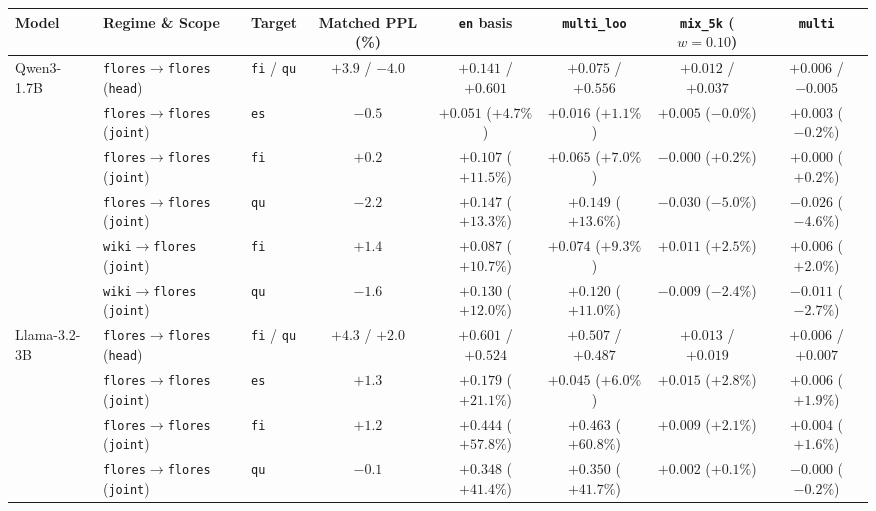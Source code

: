 \documentclass[11pt,a4paper,twocolumn]{article}
\begin{document}
\begin{table}[t]
\centering
\small
\setlength{\tabcolsep}{4.5pt}
\begin{tabular}{lllccccc}
\toprule
Model & Regime \& Scope & Target & Matched PPL (\%) & \texttt{en} basis & \texttt{multi\_loo} & \textbf{\texttt{mix\_5k}} ($w=0.10$) & \texttt{multi} \\
\midrule
\multirow{6}{*}{Qwen3-1.7B}
  & \texttt{flores$\rightarrow$flores} (\texttt{head}) & \texttt{fi} / \texttt{qu} & $+3.9$ / $-4.0$ & $+0.141$ / $\mathbf{+0.601}$ & $+0.075$ / $\mathbf{+0.556}$ & $+0.012$ / $+0.037$ & $+0.006$ / $-0.005$ \\
  & \texttt{flores$\rightarrow$flores} (\texttt{joint}) & \texttt{es} & $-0.5$ & $+0.051$ ($+4.7\%$) & $+0.016$ ($+1.1\%$) & $\mathbf{+0.005}$ ($-0.0\%$) & $+0.003$ ($-0.2\%$) \\
  & \texttt{flores$\rightarrow$flores} (\texttt{joint}) & \texttt{fi} & $+0.2$ & $+0.107$ ($+11.5\%$) & $+0.065$ ($+7.0\%$) & $\mathbf{-0.000}$ ($+0.2\%$) & $+0.000$ ($+0.2\%$) \\
  & \texttt{flores$\rightarrow$flores} (\texttt{joint}) & \texttt{qu} & $-2.2$ & $\mathbf{+0.147}$ ($+13.3\%$) & $\mathbf{+0.149}$ ($+13.6\%$) & $\mathbf{-0.030}$ ($-5.0\%$) & $-0.026$ ($-4.6\%$) \\
  & \texttt{wiki$\rightarrow$flores} (\texttt{joint}) & \texttt{fi} & $+1.4$ & $+0.087$ ($+10.7\%$) & $+0.074$ ($+9.3\%$) & $\mathbf{+0.011}$ ($+2.5\%$) & $+0.006$ ($+2.0\%$) \\
  & \texttt{wiki$\rightarrow$flores} (\texttt{joint}) & \texttt{qu} & $-1.6$ & $\mathbf{+0.130}$ ($+12.0\%$) & $\mathbf{+0.120}$ ($+11.0\%$) & $\mathbf{-0.009}$ ($-2.4\%$) & $-0.011$ ($-2.7\%$) \\
\midrule
\multirow{6}{*}{Llama-3.2-3B}
  & \texttt{flores$\rightarrow$flores} (\texttt{head}) & \texttt{fi} / \texttt{qu} & $+4.3$ / $+2.0$ & $\mathbf{+0.601}$ / $\mathbf{+0.524}$ & $\mathbf{+0.507}$ / $\mathbf{+0.487}$ & $\mathbf{+0.013}$ / $\mathbf{+0.019}$ & $+0.006$ / $+0.007$ \\
  & \texttt{flores$\rightarrow$flores} (\texttt{joint}) & \texttt{es} & $+1.3$ & $+0.179$ ($+21.1\%$) & $+0.045$ ($+6.0\%$) & $\mathbf{+0.015}$ ($+2.8\%$) & $+0.006$ ($+1.9\%$) \\
  & \texttt{flores$\rightarrow$flores} (\texttt{joint}) & \texttt{fi} & $+1.2$ & $\mathbf{+0.444}$ ($+57.8\%$) & $\mathbf{+0.463}$ ($+60.8\%$) & $\mathbf{+0.009}$ ($+2.1\%$) & $+0.004$ ($+1.6\%$) \\
  & \texttt{flores$\rightarrow$flores} (\texttt{joint}) & \texttt{qu} & $-0.1$ & $\mathbf{+0.348}$ ($+41.4\%$) & $\mathbf{+0.350}$ ($+41.7\%$) & $\mathbf{+0.002}$ ($+0.1\%$) & $-0.000$ ($-0.2\%$) \\

\end{tabular}
\end{table}
\end{document}
